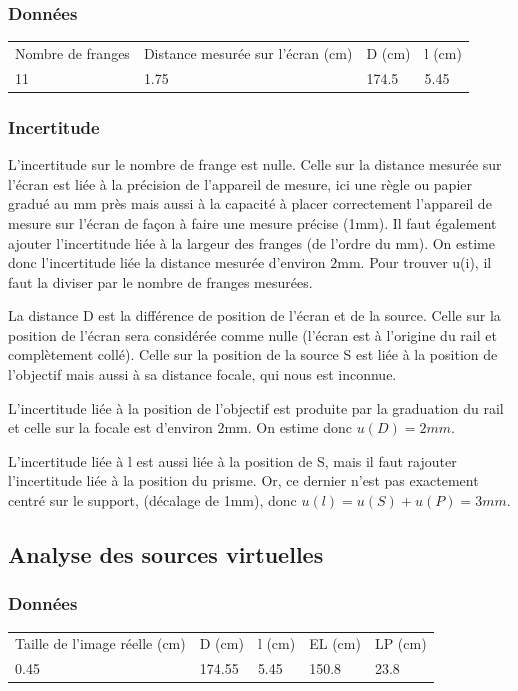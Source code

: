 \documentclass[a4paper,10pt,french]{scrartcl}
\begin{document}
\subsubsection{Données}
\begin{center}
\begin{tabular}{llll}
Nombre de franges & Distance mesurée sur l'écran (cm) & D (cm) & l (cm)\\
11 & 1.75 & 174.5 & 5.45
\end{tabular}
\end{center}
\subsubsection{Incertitude}
L'incertitude sur le nombre de frange est nulle. Celle sur la distance mesurée sur l'écran est liée à la précision de l'appareil de mesure, ici une règle ou papier gradué au mm près mais aussi à la capacité à placer correctement l'appareil de mesure sur l'écran de façon à faire une mesure précise (1mm). Il faut également ajouter l'incertitude liée à la largeur des franges (de l'ordre du mm). On estime donc l'incertitude liée la distance mesurée d'environ \(2\)mm. Pour trouver u(i), il faut la diviser par le nombre de franges mesurées.

La distance D est la différence de position de l'écran et de la source. Celle sur la position de l'écran sera considérée comme nulle (l'écran est à l'origine du rail et complètement collé). Celle sur la position de la source S est liée à la position de l'objectif mais aussi à sa distance focale, qui nous est inconnue.

L'incertitude liée à la position de l'objectif est produite par la graduation du rail et celle sur la focale est d'environ 2mm. On estime donc \(u(D) = 2mm\).

L'incertitude liée à l est aussi liée à la position de S, mais il faut rajouter l'incertitude liée à la position du prisme. Or, ce dernier n'est pas exactement centré sur le support, (décalage de 1mm), donc \(u(l) = u(S) + u(P) =  3mm\).
\subsection{Analyse des sources virtuelles}
\subsubsection{Données}
\begin{center}
\begin{tabular}{lllll}
Taille de l'image réelle (cm) & D (cm) & l (cm) & EL (cm) & LP (cm)\\
0.45 & 174.55 & 5.45 & 150.8 & 23.8
\end{tabular}
\end{center}
\end{document}
